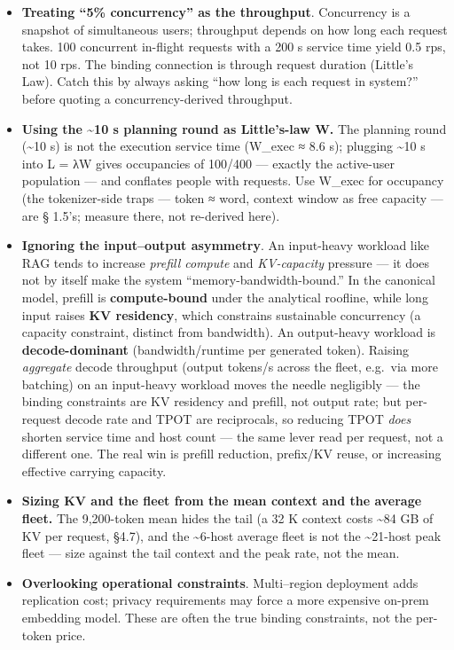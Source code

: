 \begin{itemize}
\tightlist
\item
  \textbf{Treating ``5\% concurrency'' as the throughput}. Concurrency
  is a snapshot of simultaneous users; throughput depends on how long
  each request takes. 100 concurrent in-flight requests with a 200 s
  service time yield 0.5 rps, not 10 rps. The binding connection is
  through request duration (Little's Law). Catch this by always asking
  ``how long is each request in system?'' before quoting a
  concurrency-derived throughput.
\item
  \textbf{Using the \textasciitilde10 s planning round as Little's-law
  W.} The planning round (\textasciitilde10 s) is not the execution
  service time (W\_exec ≈ 8.6 s); plugging \textasciitilde10 s into L =
  λW gives occupancies of 100/400 --- exactly the active-user population
  --- and conflates people with requests. Use W\_exec for occupancy (the
  tokenizer-side traps --- token ≈ word, context window as free capacity
  --- are § 1.5's; measure there, not re-derived here).
\item
  \textbf{Ignoring the input--output asymmetry}. An input-heavy workload
  like RAG tends to increase \emph{prefill compute} and
  \emph{KV-capacity} pressure --- it does not by itself make the system
  ``memory-bandwidth-bound.'' In the canonical model, prefill is
  \textbf{compute-bound} under the analytical roofline, while long input
  raises \textbf{KV residency}, which constrains sustainable concurrency
  (a capacity constraint, distinct from bandwidth). An output-heavy
  workload is \textbf{decode-dominant} (bandwidth/runtime per generated
  token). Raising \emph{aggregate} decode throughput (output tokens/s
  across the fleet, e.g.~via more batching) on an input-heavy workload
  moves the needle negligibly --- the binding constraints are KV
  residency and prefill, not output rate; but per-request decode rate
  and TPOT are reciprocals, so reducing TPOT \emph{does} shorten service
  time and host count --- the same lever read per request, not a
  different one. The real win is prefill reduction, prefix/KV reuse, or
  increasing effective carrying capacity.
\item
  \textbf{Sizing KV and the fleet from the mean context and the average
  fleet.} The 9,200-token mean hides the tail (a 32 K context costs
  \textasciitilde84 GB of KV per request, §4.7), and the
  \textasciitilde6-host average fleet is not the \textasciitilde21-host
  peak fleet --- size against the tail context and the peak rate, not
  the mean.
\item
  \textbf{Overlooking operational constraints}. Multi--region deployment
  adds replication cost; privacy requirements may force a more expensive
  on-prem embedding model. These are often the true binding constraints,
  not the per-token price.
\end{itemize}

